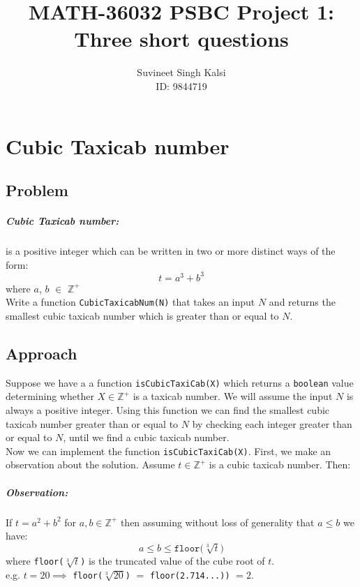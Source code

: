 \documentclass[12pt]{report}
\title{MATH-36032 PSBC Project 1: Three short questions}
\author{Suvineet Singh Kalsi \\ ID: 9844719}
\date{}
\begin{document}
\maketitle

\chapter{Cubic Taxicab number}

\section*{Problem}
\paragraph{Cubic Taxicab number:}
is a positive integer which can be written in two or more distinct ways of the form:
\begin{equation*}
	t = a^3 + b^3
\end{equation*} where $a$, $b$ $\in$ $\mathbb{Z^+}$ \\

Write a function \texttt{CubicTaxicabNum(N)} that takes an input $N$ and returns the smallest cubic taxicab number which is greater than or equal to $N$.

\section{Approach}
Suppose we have a a function \texttt{isCubicTaxiCab(X)} which returns a \texttt{boolean} value determining whether $X \in \mathbb{Z^+}$ is a taxicab number. We will assume the input $N$ is always a positive integer. Using this function we can find the smallest cubic taxicab number greater than or equal to $N$ by checking each integer greater than or equal to $N$, until we find a cubic taxicab number. \\



Now we can implement the function \texttt{isCubicTaxiCab(X)}. First, we make an observation about the solution. Assume $t \in \mathbb{Z^+}$ is a cubic taxicab number. Then:

\paragraph{Observation:}
If $t=a^2 +b^2$ for $a, b \in \mathbb{Z^+}$ then assuming without loss of generality that $a \leqslant b$ we have:
\begin{equation*}
	a \leqslant b \leqslant \texttt{floor(}\sqrt[3]{t}\texttt{)} 
\end{equation*} where \texttt{floor($\sqrt[3]{t}$)} is the truncated value of the cube root of $t$. \\ 
e.g. $t=20 \implies$ \texttt{floor($\sqrt[3]{20}$)} $=$ \texttt{floor(2.714...))} $=2$. \\
\end{document}

